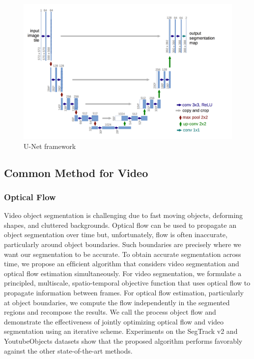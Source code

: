 \begin{figure}
    \begin{center}
        \includegraphics[width=\textwidth]{figure/unet.png}
    \end{center}
    \caption{U-Net framework}
    \label{unet}
\end{figure}




\subsection{Common Method for Video}

\subsubsection{Optical Flow}
Video object segmentation is challenging due to fast moving objects, deforming shapes, and cluttered backgrounds. Optical ﬂow can be used to propagate an object segmentation over time but, unfortunately, ﬂow is often inaccurate, particularly around object boundaries. Such boundaries are precisely where we want our segmentation to be accurate. To obtain accurate segmentation across time, we propose an efﬁcient algorithm that considers video segmentation and optical ﬂow estimation simultaneously. For video segmentation, we formulate a principled, multiscale, spatio-temporal objective function that uses optical ﬂow to propagate information between frames. For optical ﬂow estimation, particularly at object boundaries, we compute the ﬂow independently in the segmented regions and recompose the results. We call the process object ﬂow and demonstrate the effectiveness of jointly optimizing optical ﬂow and video segmentation using an iterative scheme. Experiments on the SegTrack v2 and YoutubeObjects datasets show that the proposed algorithm performs favorably against the other state-of-the-art methods.

